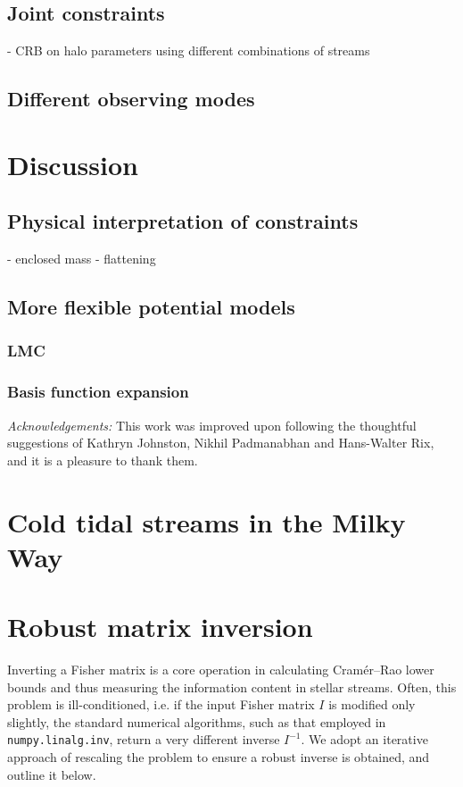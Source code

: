 \documentclass[modern]{aastex61}
\begin{document}
\subsection{Joint constraints}
- CRB on halo parameters using different combinations of streams

\subsection{Different observing modes}


\section{Discussion}

\subsection{Physical interpretation of constraints}
- enclosed mass
- flattening

\subsection{More flexible potential models}

\subsubsection{LMC}

\subsubsection{Basis function expansion}



\emph{Acknowledgements:} This work was improved upon following the thoughtful suggestions of Kathryn Johnston, Nikhil Padmanabhan and Hans-Walter Rix, and it is a pleasure to thank them.




\appendix
\section{Cold tidal streams in the Milky Way}
\label{sec:streams}

\section{Robust matrix inversion}
\label{sec:inversion}
Inverting a Fisher matrix is a core operation in calculating Cram\' er--Rao lower bounds and thus measuring the information content in stellar streams. 
Often, this problem is ill-conditioned, i.e. if the input Fisher matrix $I$ is modified only slightly, the standard numerical algorithms, such as that employed in \texttt{numpy.linalg.inv}, return a very different inverse $I^{-1}$.
We adopt an iterative approach of rescaling the problem to ensure a robust inverse is obtained, and outline it below.
\end{document}
